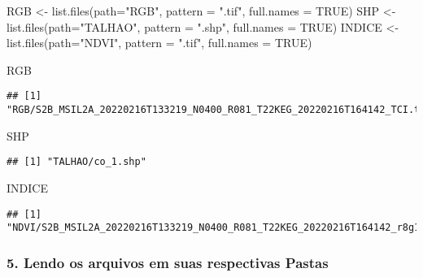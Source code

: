 \documentclass[
]{article}
\newenvironment{Shaded}{\begin{snugshade}}{\end{snugshade}}
\newcommand{\AttributeTok}[1]{\textcolor[rgb]{0.77,0.63,0.00}{#1}}
\newcommand{\ConstantTok}[1]{\textcolor[rgb]{0.00,0.00,0.00}{#1}}
\newcommand{\FunctionTok}[1]{\textcolor[rgb]{0.00,0.00,0.00}{#1}}
\newcommand{\NormalTok}[1]{#1}
\newcommand{\OtherTok}[1]{\textcolor[rgb]{0.56,0.35,0.01}{#1}}
\newcommand{\StringTok}[1]{\textcolor[rgb]{0.31,0.60,0.02}{#1}}
\begin{document}
\begin{Shaded}
\begin{Highlighting}[]
\NormalTok{RGB }\OtherTok{\textless{}{-}} \FunctionTok{list.files}\NormalTok{(}\AttributeTok{path=}\StringTok{"RGB"}\NormalTok{, }\AttributeTok{pattern =} \StringTok{".tif"}\NormalTok{, }\AttributeTok{full.names =} \ConstantTok{TRUE}\NormalTok{)    }
\NormalTok{SHP }\OtherTok{\textless{}{-}} \FunctionTok{list.files}\NormalTok{(}\AttributeTok{path=}\StringTok{"TALHAO"}\NormalTok{, }\AttributeTok{pattern =} \StringTok{".shp"}\NormalTok{, }\AttributeTok{full.names =} \ConstantTok{TRUE}\NormalTok{)}
\NormalTok{INDICE }\OtherTok{\textless{}{-}} \FunctionTok{list.files}\NormalTok{(}\AttributeTok{path=}\StringTok{"NDVI"}\NormalTok{, }\AttributeTok{pattern =} \StringTok{".tif"}\NormalTok{, }\AttributeTok{full.names =} \ConstantTok{TRUE}\NormalTok{) }

\NormalTok{RGB}
\end{Highlighting}
\end{Shaded}

\begin{verbatim}
## [1] "RGB/S2B_MSIL2A_20220216T133219_N0400_R081_T22KEG_20220216T164142_TCI.tif"
\end{verbatim}

\begin{Shaded}
\begin{Highlighting}[]
\NormalTok{SHP}
\end{Highlighting}
\end{Shaded}

\begin{verbatim}
## [1] "TALHAO/co_1.shp"
\end{verbatim}

\begin{Shaded}
\begin{Highlighting}[]
\NormalTok{INDICE}
\end{Highlighting}
\end{Shaded}

\begin{verbatim}
## [1] "NDVI/S2B_MSIL2A_20220216T133219_N0400_R081_T22KEG_20220216T164142_r8g11b4.tif"
\end{verbatim}

\hypertarget{lendo-os-arquivos-em-suas-respectivas-pastas}{%
\subsubsection{5. Lendo os arquivos em suas respectivas
Pastas}\label{lendo-os-arquivos-em-suas-respectivas-pastas}}
\end{document}

